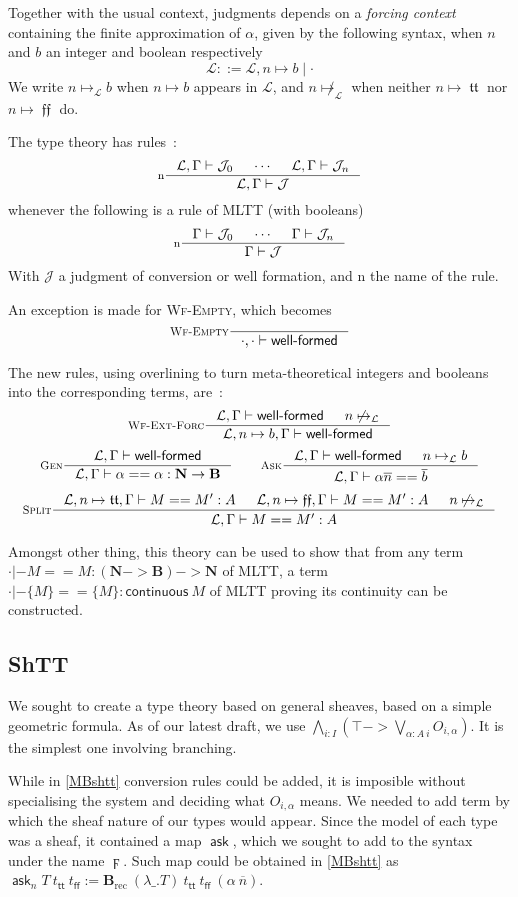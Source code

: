 \documentclass[11pt]{article}
\DeclareMathOperator{\ask}{\mathsf{ask}}
\DeclareMathOperator{\rec}{rec}
\DeclareMathOperator{\true}{\mathsf{tt}}
\DeclareMathOperator{\false}{\mathsf{ff}}
\DeclareMathOperator{\mtrue}{\mathfrak{tt}}
\DeclareMathOperator{\mfalse}{\mathfrak{ff}}
\newcommand{\ovl}{\overline}
\newcommand{\0}{\mathbf{0}}
\newcommand{\1}{\mathbf{1}}
\newcommand{\nat}{\mathbf{N}}
\newcommand{\bool}{\mathbf{B}}
\newcommand{\tctx}{\Gamma}
\newcommand{\Wf}{\textsf{well-formed}}
\newcommand{\fctx}{\mathcal{L}}
\begin{document}
Together with the usual context, judgments depends on a \emph{forcing context} containing the finite approximation of $\alpha$, given by the following syntax, when $n$ and $b$ an integer and boolean respectively
$$ \fctx ::= \fctx, n \mapsto b \mid \cdot$$
We write $n\mapsto_\fctx b$ when $n\mapsto b$ appears in $\fctx$, and $n\not\mapsto_\fctx$ when neither $n\mapsto \mtrue$ nor $n\mapsto \mfalse$ do.

The type theory has rules~:
$$
    \inference[n]{\fctx,\tctx |- \mathcal{J}_0 & \cdots & \fctx,\tctx |- \mathcal{J}_n}{\fctx,\tctx |- \mathcal{J}}
$$
whenever the following is a rule of MLTT (with booleans)
$$
    \inference[n]{\tctx |- \mathcal{J}_0 & \cdots & \tctx |- \mathcal{J}_n}{\tctx |- \mathcal{J}}
$$
With $\mathcal{J}$ a judgment of conversion or well formation, and $\text{n}$ the name of the rule.

An exception is made for \textsc{Wf-Empty}, which becomes
$$
    \inference[\textsc{Wf-Empty}]{}{\cdot,\cdot |- \Wf}
$$

The new rules, using overlining to turn meta-theoretical integers and booleans into the corresponding terms, are~:
$$
    \inference[\textsc{Wf-Ext-Forc}]{\fctx,\tctx |- \Wf & n\not\mapsto_\fctx}{\fctx, n\mapsto b, \tctx |- \Wf}
$$
$$
    \inference[\textsc{Gen}]{\fctx,\tctx|- \Wf}{\fctx,\tctx |- \alpha == \alpha : \nat -> \bool}
    \qquad
    \inference[\textsc{Ask}]{\fctx,\tctx|- \Wf &n\mapsto_\fctx b}{\fctx, \tctx |- \alpha \ovl n == \ovl b}
$$
$$
    \inference[\textsc{Split}]{\fctx,n\mapsto \mtrue,\tctx |-M == M' :A & \fctx, n\mapsto\mfalse, \tctx |- M == M' : A & n\not\mapsto_\fctx}{\fctx,\tctx |- M == M' : A}
$$

Amongst other thing, this theory can be used to show that from any term $\cdot |- M == M : (\nat -> \bool) -> \nat$ of MLTT, a term $\cdot |- \{M\} == \{M\} : \mathsf{continuous}\ M$ of MLTT proving its continuity can be constructed.

\subsection{ShTT}

We sought to create a type theory based on general sheaves, based on a simple geometric formula.
As of our latest draft, we use $\bigwedge\limits_{i : I} \left(\top -> \bigvee\limits_{\alpha : A\ i}O_{i,\alpha}\right)$.
It is the simplest one involving branching.

While in \ref{MBshtt} conversion rules could be added, it is imposible without specialising the system and deciding what $O_{i,\alpha}$ means.
We needed to add term by which the sheaf nature of our types would appear.
Since the model of each type was a sheaf, it contained a map $\ask$, which we sought to add to the syntax under the name $\digamma$.
Such map could be obtained in \ref{MBshtt} as $\ask_n T\ t_{\true}\ t_{\false} := \bool_{\rec}\ (\lambda\_.T)\  t_{\true}\ t_{\false}\ (\alpha\ \ovl{n})$.
\end{document}
